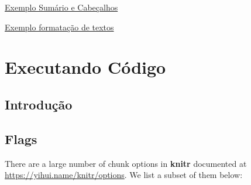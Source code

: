 \documentclass[
]{book}
\begin{document}
\href{exemplos/102-sumario_e_cabecalho.html}{Exemplo Sumário e Cabeçalhos}

\href{exemplos/103-formatacao_de_texto.html}{Exemplo formatação de textos}

\hypertarget{executando-cuxf3digo}{%
\chapter{Executando Código}\label{executando-cuxf3digo}}

\hypertarget{introduuxe7uxe3o}{%
\section{Introdução}\label{introduuxe7uxe3o}}

\hypertarget{flags}{%
\section{Flags}\label{flags}}

There are a large number of chunk options in \textbf{knitr} documented at \url{https://yihui.name/knitr/options}. We list a subset of them below:
\end{document}
